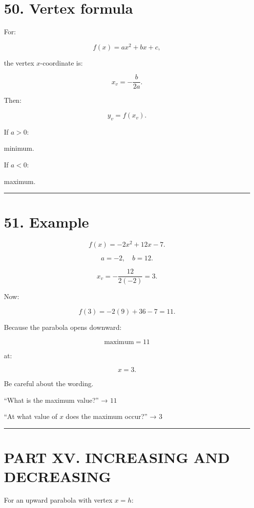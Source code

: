 \documentclass[
]{article}
\begin{document}
\section{50. Vertex formula}\label{vertex-formula}

For:

\[
f(x)=ax^2+bx+c,
\]

the vertex \(x\)-coordinate is:

\[
\boxed{x_v=-\frac{b}{2a}}.
\]

Then:

\[
\boxed{y_v=f(x_v)}.
\]

If \(a>0\):

minimum.

If \(a<0\):

maximum.

\begin{center}\rule{0.5\linewidth}{0.5pt}\end{center}

\section{51. Example}\label{example}

\[
f(x)=-2x^2+12x-7.
\]

\[
a=-2,\quad b=12.
\]

\[
x_v=-\frac{12}{2(-2)}
=
3.
\]

Now:

\[
f(3)
=
-2(9)+36-7
=
11.
\]

Because the parabola opens downward:

\[
\boxed{\text{maximum}=11}
\]

at:

\[
\boxed{x=3}.
\]

Be careful about the wording.

``What is the maximum value?'' → \(11\)

``At what value of \(x\) does the maximum occur?'' → \(3\)

\begin{center}\rule{0.5\linewidth}{0.5pt}\end{center}

\section{PART XV. INCREASING AND
DECREASING}\label{part-xv.-increasing-and-decreasing}

For an upward parabola with vertex \(x=h\):
\end{document}
